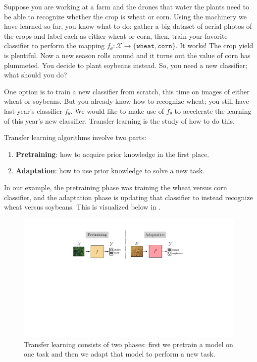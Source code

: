 Suppose you are working at a farm and the drones that water the plants need to be able to recognize whether the crop is wheat or corn. Using the machinery we have learned so far, you know what to do: gather a big dataset of aerial photos of the crops and label each as either wheat or corn, then, train your favorite classifier to perform the mapping $f_{\theta}: \mathcal{X} \rightarrow \{\texttt{wheat}, \texttt{corn}\}$. It works! The crop yield is plentiful. Now a new season rolls around and it turns out the value of corn has plummeted. You decide to plant soybeans instead. So, you need a new classifier; what should you do?

One option is to train a new classifier from scratch, this time on images of either wheat or soybeans. But you already know how to recognize wheat; you still have last year's classifier $f_{\theta}$. We would like to make use of $f_{\theta}$ to accelerate the learning of this year's new classifier. Transfer learning is the study of how to do this. 

Transfer learning algorithms involve two parts:
\begin{enumerate}
    \item {}\textbf{Pretraining}: how to acquire prior knowledge in the first place.
    \item \textbf{Adaptation}: how to use prior knowledge to solve a new task.
\end{enumerate}

In our example, the pretraining phase was training the wheat versus corn classifier, and the adaptation phase is updating that classifier to instead recognize wheat versus soybeans. This is visualized below in \fig{\ref{fig:transfer_learning:finetuning_basic}}.%
\begin{figure}[h!]
    \centering
    \centerline{
    \includegraphics[width=0.85\linewidth]{./figures/transfer_learning/pretraining_and_adaptation.pdf}
    }
    \caption{Transfer learning consists of two phases: first we pretrain a model on one task and then we adapt that model to perform a new task.}
    \label{fig:transfer_learning:finetuning_basic}
\end{figure}

